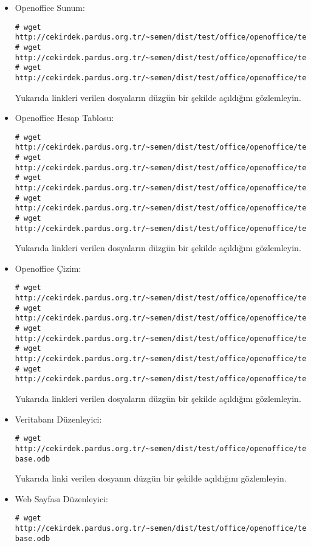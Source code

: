 \documentclass[a4paper,10pt]{article}
\begin{document}
\begin{enumerate}
\begin{itemize}
\item Openoffice Sunum:
\begin{verbatim}
# wget http://cekirdek.pardus.org.tr/~semen/dist/test/office/openoffice/test_ooimpress.odp
# wget http://cekirdek.pardus.org.tr/~semen/dist/test/office/openoffice/test_ooimpress.ppt
# wget http://cekirdek.pardus.org.tr/~semen/dist/test/office/openoffice/test_ooimpress.pot
\end{verbatim}

Yukarıda linkleri verilen dosyaların düzgün bir şekilde açıldığını gözlemleyin.

\item Openoffice Hesap Tablosu:
\begin{verbatim}
# wget http://cekirdek.pardus.org.tr/~semen/dist/test/office/openoffice/test_oocalc.xls
# wget http://cekirdek.pardus.org.tr/~semen/dist/test/office/openoffice/test_oocalc.xlt
# wget http://cekirdek.pardus.org.tr/~semen/dist/test/office/openoffice/test_oocalc.ods
# wget http://cekirdek.pardus.org.tr/~semen/dist/test/office/openoffice/test_oocalc.ots
# wget http://cekirdek.pardus.org.tr/~semen/dist/test/office/openoffice/test_oocalc.csv	
\end{verbatim}

Yukarıda linkleri verilen dosyaların düzgün bir şekilde açıldığını gözlemleyin.

\item Openoffice Çizim:
\begin{verbatim}
# wget http://cekirdek.pardus.org.tr/~semen/dist/test/office/openoffice/test_oodraw.gif
# wget http://cekirdek.pardus.org.tr/~semen/dist/test/office/openoffice/test_oodraw.jpg
# wget http://cekirdek.pardus.org.tr/~semen/dist/test/office/openoffice/test_oodraw.png
# wget http://cekirdek.pardus.org.tr/~semen/dist/test/office/openoffice/test_oodraw.tif
# wget http://cekirdek.pardus.org.tr/~semen/dist/test/office/openoffice/test_oodraw.odg
\end{verbatim}

Yukarıda linkleri verilen dosyaların düzgün bir şekilde açıldığını gözlemleyin.
\item Veritabanı Düzenleyici:
\begin{verbatim}
# wget http://cekirdek.pardus.org.tr/~semen/dist/test/office/openoffice/test_openoffice-base.odb
\end{verbatim}

Yukarıda linki verilen dosyanın düzgün bir şekilde açıldığını gözlemleyin.

\item Web Sayfası Düzenleyici:
\begin{verbatim}
# wget http://cekirdek.pardus.org.tr/~semen/dist/test/office/openoffice/test_openoffice-base.odb
\end{verbatim}


\end{itemize}
\end{enumerate}
\end{document}
